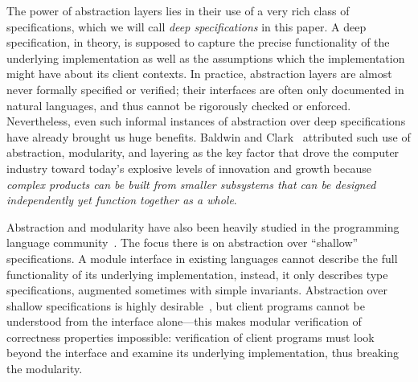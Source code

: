The power of abstraction layers lies in their use of a very rich class
of specifications, which we will call {\em deep specifications} in
this paper. A deep specification, in theory, is supposed to capture
the precise functionality of the underlying implementation as well as
the assumptions which the implementation might have about its client
contexts. In practice, abstraction layers are almost never formally
specified or verified; their interfaces are often only documented in
natural languages, and thus cannot be rigorously checked or
enforced. Nevertheless, even such informal instances of abstraction
over deep specifications have already brought us huge
benefits. Baldwin and Clark~\cite{baldwin00} attributed such use of
abstraction, modularity, and layering as the key factor that drove the computer
industry toward today's explosive levels of innovation and growth
because {\em complex products can be built from smaller subsystems
  that can be designed independently yet function together as a
  whole}.

Abstraction and modularity have also been heavily studied
in the programming language community~\cite{reynolds98,pierce02}.
The focus there is on abstraction over ``shallow''
specifications. A module interface in existing languages cannot
describe the full functionality of its underlying implementation,
instead, it only describes type specifications, augmented sometimes
with simple invariants.  Abstraction over shallow
specifications is highly desirable~\cite{mitchell86}, but
client programs cannot be understood from the interface alone---this 
makes modular verification of correctness properties
impossible: verification of client programs must look beyond the
interface and examine its underlying implementation, thus breaking the
modularity.

